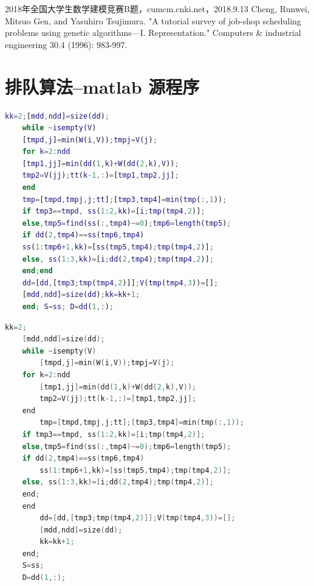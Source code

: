 \documentclass{cumcmthesis}
\begin{document}
	
	\begin{thebibliography}{9}%
		 2018年全国大学生数学建模竞赛B题，cumcm.cnki.net，2018.9.13
		 Cheng, Runwei, Mitsuo Gen, and Yasuhiro Tsujimura. "A tutorial survey of job-shop scheduling problems using genetic algorithms—I. Representation." Computers \& industrial engineering 30.4 (1996): 983-997.
	\end{thebibliography}
	
	\newpage
	\appendix
	\section{排队算法--matlab 源程序}
	\begin{lstlisting}[language=matlab]
	kk=2;[mdd,ndd]=size(dd);
	while ~isempty(V)
	[tmpd,j]=min(W(i,V));tmpj=V(j);
	for k=2:ndd
	[tmp1,jj]=min(dd(1,k)+W(dd(2,k),V));
	tmp2=V(jj);tt(k-1,:)=[tmp1,tmp2,jj];
	end
	tmp=[tmpd,tmpj,j;tt];[tmp3,tmp4]=min(tmp(:,1));
	if tmp3==tmpd, ss(1:2,kk)=[i;tmp(tmp4,2)];
	else,tmp5=find(ss(:,tmp4)~=0);tmp6=length(tmp5);
	if dd(2,tmp4)==ss(tmp6,tmp4)
	ss(1:tmp6+1,kk)=[ss(tmp5,tmp4);tmp(tmp4,2)];
	else, ss(1:3,kk)=[i;dd(2,tmp4);tmp(tmp4,2)];
	end;end
	dd=[dd,[tmp3;tmp(tmp4,2)]];V(tmp(tmp4,3))=[];
	[mdd,ndd]=size(dd);kk=kk+1;
	end; S=ss; D=dd(1,:);
	 \end{lstlisting}
	\begin{lstlisting}[language=c]
	kk=2;
	[mdd,ndd]=size(dd);
	while ~isempty(V)
		[tmpd,j]=min(W(i,V));tmpj=V(j);
	for k=2:ndd
		[tmp1,jj]=min(dd(1,k)+W(dd(2,k),V));
		tmp2=V(jj);tt(k-1,:)=[tmp1,tmp2,jj];
	end
		tmp=[tmpd,tmpj,j;tt];[tmp3,tmp4]=min(tmp(:,1));
	if tmp3==tmpd, ss(1:2,kk)=[i;tmp(tmp4,2)];
	else,tmp5=find(ss(:,tmp4)~=0);tmp6=length(tmp5);
	if dd(2,tmp4)==ss(tmp6,tmp4)
		ss(1:tmp6+1,kk)=[ss(tmp5,tmp4);tmp(tmp4,2)];
	else, ss(1:3,kk)=[i;dd(2,tmp4);tmp(tmp4,2)];
	end;
	end
		dd=[dd,[tmp3;tmp(tmp4,2)]];V(tmp(tmp4,3))=[];
		[mdd,ndd]=size(dd);
		kk=kk+1;
	end;
	S=ss;
	D=dd(1,:);
	 \end{lstlisting}
	
	
	
\end{document}
